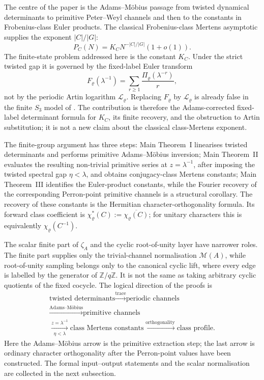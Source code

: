 \documentclass[11pt,a4paper]{amsart}
\theoremstyle{plain}
\theoremstyle{definition}
\theoremstyle{remark}
\newcommand{\ZZ}{\mathbb{Z}}
\begin{document}
The centre of the paper is the Adams--M\"obius passage from twisted
dynamical determinants to primitive Peter--Weyl channels and then to the
constants in Frobenius-class Euler products.  The classical
Frobenius-class Mertens asymptotic supplies the exponent
\(|C|/|G|\):
\[
  P_C(N)=K_C N^{-|C|/|G|}(1+o(1)).
\]
The finite-state problem addressed here is the constant \(K_C\).  Under
the strict twisted gap it is governed by the fixed-label Euler transform
\[
  F_\varrho(\lambda^{-1})
  =\sum_{r\ge1}\frac{\Pi_\varrho(\lambda^{-r})}{r},
\]
not by the periodic Artin logarithm \(\mathcal L_\varrho\).  Replacing
\(F_\varrho\) by \(\mathcal L_\varrho\) is already false in the finite
\(S_3\) model of .  The contribution is
therefore the Adams-corrected fixed-label determinant formula for
\(K_C\), its finite recovery, and the obstruction to Artin substitution;
it is not a new claim about the classical class-Mertens exponent.

The finite-group argument has three steps: Main Theorem~I linearises
twisted determinants and performs primitive Adams--M\"obius inversion;
Main Theorem~II evaluates the resulting non-trivial primitive series at
\(z=\lambda^{-1}\), after imposing the twisted spectral gap
\(\eta<\lambda\), and obtains conjugacy-class Mertens constants; Main
Theorem~III identifies the Euler-product constants, while the Fourier
recovery of the corresponding Perron-point primitive channels is a
structural corollary.  The recovery of these constants is the Hermitian
character-orthogonality formula. Its forward class coefficient is
\(\chi_\varrho^\ast(C):=\overline{\chi_\varrho(C)}\); for unitary
characters this is equivalently \(\chi_\varrho(C^{-1})\).

The scalar finite part of \(\zeta_A\) and the cyclic root-of-unity layer
have narrower roles. The finite part supplies only the trivial-channel
normalisation \(\mathcal M(A)\), while root-of-unity sampling belongs
only to the canonical cyclic lift, where every edge is labelled by the
generator of \(\ZZ/q\ZZ\). It is not the same as taking arbitrary cyclic
quotients of the fixed cocycle. The logical direction of the proofs is
\[
  \begin{array}{c}
    \text{twisted determinants}
    \xrightarrow{\text{trace}}
    \text{periodic channels} \\[2pt]
    \xrightarrow{\text{Adams--M\"obius}}
    \text{primitive channels} \\[2pt]
    \xrightarrow[\eta<\lambda]{z=\lambda^{-1}}
    \text{class Mertens constants}
    \xrightarrow{\text{orthogonality}}
    \text{class profile}.
  \end{array}
\]
Here the Adams--M\"obius arrow is the primitive extraction step; the last
arrow is ordinary character orthogonality after the Perron-point values
have been constructed. The formal input--output statements and the scalar
normalisation are collected in the next subsection.
\end{document}
